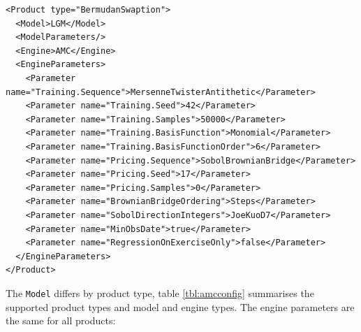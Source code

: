 \documentclass[12pt, a4paper]{article}
\begin{document}
\begin{verbatim}
<Product type="BermudanSwaption">
  <Model>LGM</Model>
  <ModelParameters/>
  <Engine>AMC</Engine>
  <EngineParameters>
    <Parameter name="Training.Sequence">MersenneTwisterAntithetic</Parameter>
    <Parameter name="Training.Seed">42</Parameter>
    <Parameter name="Training.Samples">50000</Parameter>
    <Parameter name="Training.BasisFunction">Monomial</Parameter>
    <Parameter name="Training.BasisFunctionOrder">6</Parameter>
    <Parameter name="Pricing.Sequence">SobolBrownianBridge</Parameter>
    <Parameter name="Pricing.Seed">17</Parameter>
    <Parameter name="Pricing.Samples">0</Parameter>
    <Parameter name="BrownianBridgeOrdering">Steps</Parameter>
    <Parameter name="SobolDirectionIntegers">JoeKuoD7</Parameter>
    <Parameter name="MinObsDate">true</Parameter>
    <Parameter name="RegressionOnExerciseOnly">false</Parameter>
  </EngineParameters>
</Product>
\end{verbatim}

The \verb+Model+ differs by product type, table \ref{tbl:amcconfig} summarises the supported product types and model and
engine types. The engine parameters are the same for all products:
\end{document}
